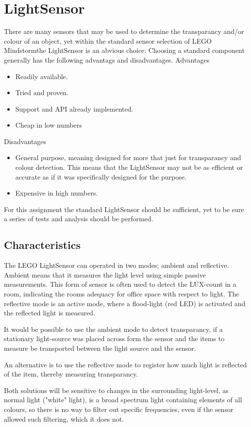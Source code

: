 \section{LightSensor}
There are many sensors that may be used to determine the transparancy and/or colour of an object, yet within the standard sensor selection of LEGO Mindstorm\textregistered the LightSensor is an abvious choice. Choosing a standard component generally has the following advantags and disadvantages.
\noindent Advantages
\begin{itemize}
    \item Readily available.
    \item Tried and proven.
    \item Support and API already implemented.
    \item Cheap in low numbers
\end{itemize}
\noindent Disadvantages
\begin{itemize}
    \item General purpose, meaning designed for more that just for transparancy and colour detection. This means that the LightSensor may not be as efficient or accurate as if it was specifically designed for the purpose.
    \item Expensive in high numbers.
\end{itemize}
For this assignment the standard LightSensor should be sufficient, yet to be sure a series of tests and analysis should be performed.
\subsection{Characteristics}
The LEGO LightSensor can operated in two modes; ambient and reflective. Ambient means that it measures the light level using simple passive measurements. This form of sensor is often used to detect the LUX-count in a room, indicating the rooms adequacy for office space with respect to light. The reflective mode is an active mode, where a flood-light (red LED) is activated and the reflected light is measured.

It would be possible to use the ambient mode to detect transparancy, if a stationary light-source was placed across form the sensor and the items to measure be transported between the light source and the sensor.

An alternative is to use the reflective mode to register how much light is reflected of the item, thereby measuring transparancy.

Both solutions will be sensitive to changes in the surrounding light-level, as normal light ("white" light), is a broad spectrum light containing elements of all colours, so there is no way to filter out specific frequencies, even if the sensor allowed such filtering, which it does not. 

